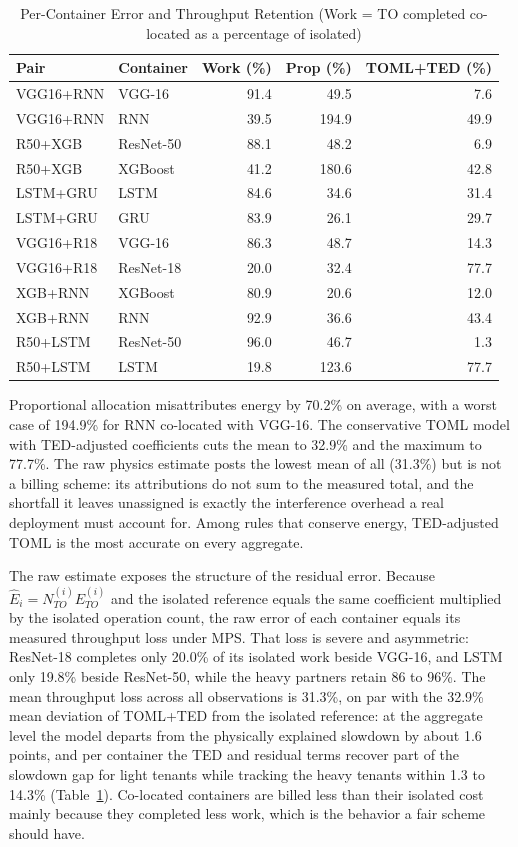 \documentclass[conference]{IEEEtran}
\begin{document}
\begin{table}[t]
\centering
\caption{Per-Container Error and Throughput Retention (Work = TO completed co-located as a percentage of isolated)}
\label{tab:percontainer}
\small
\begin{tabular}{llrrr}
\toprule
\textbf{Pair} & \textbf{Container} & \textbf{Work (\%)} & \textbf{Prop (\%)} & \textbf{TOML+TED (\%)} \\
\midrule
VGG16+RNN & VGG-16 & 91.4 & 49.5 & 7.6 \\
VGG16+RNN & RNN & 39.5 & 194.9 & 49.9 \\
R50+XGB & ResNet-50 & 88.1 & 48.2 & 6.9 \\
R50+XGB & XGBoost & 41.2 & 180.6 & 42.8 \\
LSTM+GRU & LSTM & 84.6 & 34.6 & 31.4 \\
LSTM+GRU & GRU & 83.9 & 26.1 & 29.7 \\
VGG16+R18 & VGG-16 & 86.3 & 48.7 & 14.3 \\
VGG16+R18 & ResNet-18 & 20.0 & 32.4 & 77.7 \\
XGB+RNN & XGBoost & 80.9 & 20.6 & 12.0 \\
XGB+RNN & RNN & 92.9 & 36.6 & 43.4 \\
R50+LSTM & ResNet-50 & 96.0 & 46.7 & 1.3 \\
R50+LSTM & LSTM & 19.8 & 123.6 & 77.7 \\
\bottomrule
\end{tabular}
\end{table}


Proportional allocation misattributes energy by 70.2\% on average, with a worst case of 194.9\% for RNN co-located with VGG-16. The conservative TOML model with TED-adjusted coefficients cuts the mean to 32.9\% and the maximum to 77.7\%. The raw physics estimate posts the lowest mean of all (31.3\%) but is not a billing scheme: its attributions do not sum to the measured total, and the shortfall it leaves unassigned is exactly the interference overhead a real deployment must account for. Among rules that conserve energy, TED-adjusted TOML is the most accurate on every aggregate.

The raw estimate exposes the structure of the residual error. Because $\hat{E}_i = N_{TO}^{(i)} E_{TO}^{(i)}$ and the isolated reference equals the same coefficient multiplied by the isolated operation count, the raw error of each container equals its measured throughput loss under MPS. That loss is severe and asymmetric: ResNet-18 completes only 20.0\% of its isolated work beside VGG-16, and LSTM only 19.8\% beside ResNet-50, while the heavy partners retain 86 to 96\%. The mean throughput loss across all observations is 31.3\%, on par with the 32.9\% mean deviation of TOML+TED from the isolated reference: at the aggregate level the model departs from the physically explained slowdown by about 1.6 points, and per container the TED and residual terms recover part of the slowdown gap for light tenants while tracking the heavy tenants within 1.3 to 14.3\% (Table~\ref{tab:percontainer}). Co-located containers are billed less than their isolated cost mainly because they completed less work, which is the behavior a fair scheme should have.
\end{document}
